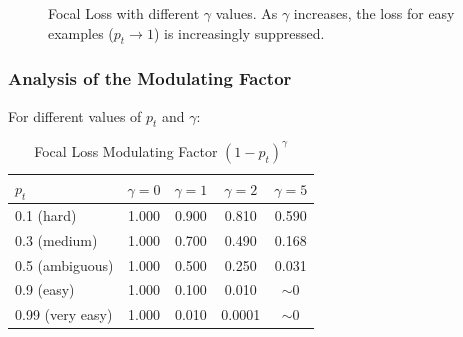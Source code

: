 \begin{figure}[htbp]
    \centering
    \caption[Focal loss modulation]{Focal Loss with different $\gamma$ values. As $\gamma$ increases, the loss for easy examples ($p_t \to 1$) is increasingly suppressed.}
    \label{fig:focal_loss}
\end{figure}

\subsubsection{Analysis of the Modulating Factor}

For different values of $p_t$ and $\gamma$:

\begin{table}[ht]
    \centering
    \caption[Focal Loss Modulating Factor]{Focal Loss Modulating Factor $(1 - p_t)^\gamma$}
    \begin{tabular}{L{2.5cm} c c c c}
        \toprule
        $p_t$ & $\gamma = 0$ & $\gamma = 1$ & $\gamma = 2$ & $\gamma = 5$ \\
         (hard) & 1.000 & 0.900 & 0.810 & 0.590 \\
        0.3 (medium) & 1.000 & 0.700 & 0.490 & 0.168 \\
        0.5 (ambiguous) & 1.000 & 0.500 & 0.250 & 0.031 \\
        0.9 (easy) & 1.000 & 0.100 & 0.010 & $\sim$0 \\
        0.99 (very easy) & 1.000 & 0.010 & 0.0001 & $\sim$0 \\
        \bottomrule
    \end{tabular}
\end{table}

